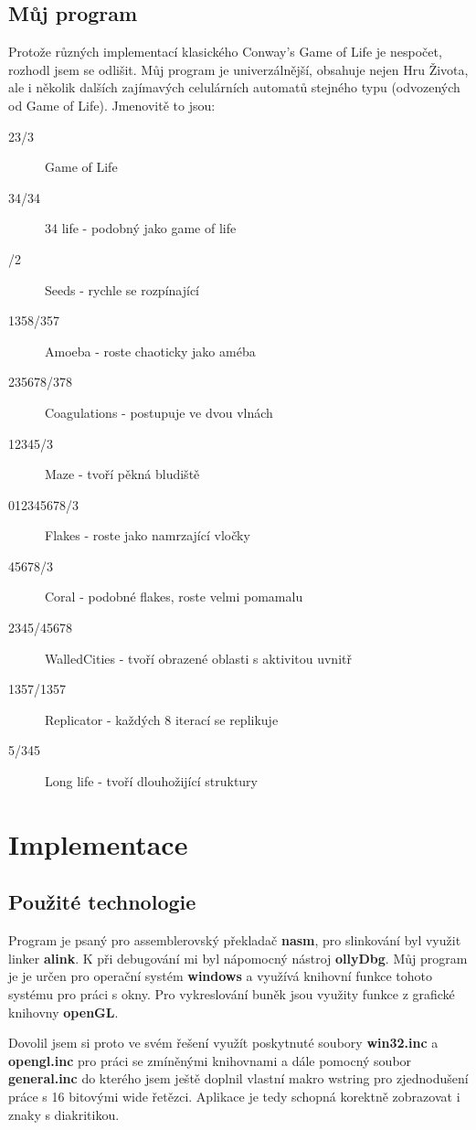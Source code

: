 \documentclass[11pt,a4paper,titlepage]{article}
\begin{document}
\subsection{Můj program}
Protože různých implementací klasického Conway's Game of Life je nespočet, rozhodl jsem se odlišit.
Můj program je univerzálnější, obsahuje nejen Hru Života, ale i několik dalších zajímavých celulárních automatů stejného typu (odvozených od Game of Life). Jmenovitě to jsou:
\begin{description}
  \item[23/3] Game of Life
  \item[34/34] 34 life - podobný jako game of life
  \item[/2] Seeds - rychle se rozpínající
  \item[1358/357] Amoeba - roste chaoticky jako améba
  \item[235678/378] Coagulations - postupuje ve dvou vlnách
  \item[12345/3] Maze - tvoří pěkná bludiště
  \item[012345678/3] Flakes - roste jako namrzající vločky
  \item[45678/3] Coral - podobné flakes, roste velmi pomamalu
  \item[2345/45678] WalledCities - tvoří obrazené oblasti s aktivitou uvnitř
  \item[1357/1357] Replicator - každých 8 iterací se replikuje
  \item[5/345] Long life - tvoří dlouhožijící struktury
\end{description}

\newpage
\section{Implementace}
\subsection{Použité technologie}
Program je psaný pro assemblerovský překladač {\bf nasm}, pro slinkování byl využit linker {\bf alink}.
K při debugování mi byl nápomocný nástroj {\bf ollyDbg}.
Můj program je je určen pro operační systém {\bf windows} a využívá knihovní funkce tohoto systému pro práci s okny. Pro vykreslování buněk jsou využity funkce z grafické knihovny {\bf openGL}.

Dovolil jsem si proto ve svém řešení využít poskytnuté soubory {\bf win32.inc} a {\bf opengl.inc} pro práci se zmíněnými knihovnami a dále pomocný soubor {\bf general.inc} do kterého jsem ještě doplnil vlastní makro wstring pro zjednodušení práce s 16 bitovými wide řetězci. Aplikace je tedy schopná korektně zobrazovat i znaky s diakritikou.
\end{document}
